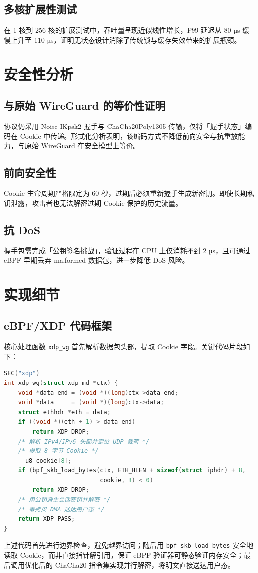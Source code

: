 \section{多核扩展性测试}
在 1 核到 256 核的扩展测试中，吞吐量呈现近似线性增长，P99 延迟从 80 µs 缓慢上升至 110 µs，证明无状态设计消除了传统锁与缓存失效带来的扩展瓶颈。\par
\chapter{安全性分析}
\section{与原始 WireGuard 的等价性证明}
协议仍采用 Noise IKpsk2 握手与 ChaCha20Poly1305 传输，仅将「握手状态」编码在 Cookie 中传递。形式化分析表明，该编码方式不降低前向安全与抗重放能力，与原始 WireGuard 在安全模型上等价。\par
\section{前向安全性}
Cookie 生命周期严格限定为 60 秒，过期后必须重新握手生成新密钥。即使长期私钥泄露，攻击者也无法解密过期 Cookie 保护的历史流量。\par
\section{抗 DoS}
握手包需完成「公钥签名挑战」，验证过程在 CPU 上仅消耗不到 2 µs，且可通过 eBPF 早期丢弃 malformed 数据包，进一步降低 DoS 风险。\par
\chapter{实现细节}
\section{eBPF/XDP 代码框架}
核心处理函数 \texttt{xdp\_{}wg} 首先解析数据包头部，提取 Cookie 字段。关键代码片段如下：\par
\begin{lstlisting}[language=c]
SEC("xdp")
int xdp_wg(struct xdp_md *ctx) {
    void *data_end = (void *)(long)ctx->data_end;
    void *data     = (void *)(long)ctx->data;
    struct ethhdr *eth = data;
    if ((void *)(eth + 1) > data_end)
        return XDP_DROP;
    /* 解析 IPv4/IPv6 头部并定位 UDP 载荷 */
    /* 提取 8 字节 Cookie */
    __u8 cookie[8];
    if (bpf_skb_load_bytes(ctx, ETH_HLEN + sizeof(struct iphdr) + 8,
                           cookie, 8) < 0)
        return XDP_DROP;
    /* 用公钥派生会话密钥并解密 */
    /* 零拷贝 DMA 送达用户态 */
    return XDP_PASS;
}
\end{lstlisting}
上述代码首先进行边界检查，避免越界访问；随后用 \texttt{bpf\_{}skb\_{}load\_{}bytes} 安全地读取 Cookie，而非直接指针解引用，保证 eBPF 验证器可静态验证内存安全；最后调用优化后的 ChaCha20 指令集实现并行解密，将明文直接送达用户态。\par
